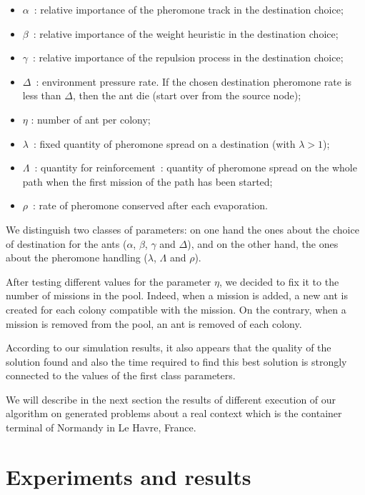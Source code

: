 \documentclass[a4paper,10pt]{article}
\begin{document}
\begin{itemize}
 \item $\alpha$ : relative importance of the pheromone track in the destination choice;
 \item $\beta$ :  relative importance of the weight heuristic in the destination choice;
 \item $\gamma$ : relative importance of the repulsion process in the destination choice;
 \item $\Delta$ : environment pressure rate. If the chosen destination pheromone rate is less than $\Delta$, then the ant die (start over from the source node);
 \item $\eta$ : number of ant per colony;
 \item $\lambda$ : fixed quantity of pheromone spread on a destination (with $\lambda > 1$);
 \item $\Lambda$ : quantity for reinforcement : quantity of pheromone spread on the whole path when the first mission of the path has been started;
 \item $\rho$ : rate of pheromone conserved after each evaporation.
\end{itemize}

We distinguish two classes of parameters: on one hand the ones about the choice of destination for the ants ($\alpha$, $\beta$, $\gamma$ and $\Delta$), and on the other hand, the ones about the pheromone handling ($\lambda$, $\Lambda$ and $\rho$).

After testing different values for the parameter $\eta$, we decided to fix it to the number of missions in the pool. Indeed, when a mission is added, a new ant is created for each colony compatible with the mission. On the contrary, when a mission is removed from the pool, an ant is removed of each colony.

According to our simulation results, it also appears that the quality of the solution found and also the time required to find this best solution is strongly connected to the values of the first class parameters.

We will describe in the next section the results of different execution of our algorithm on generated problems about a real context which is the container terminal of Normandy in Le Havre, France.

\section{Experiments and results}
\end{document}
